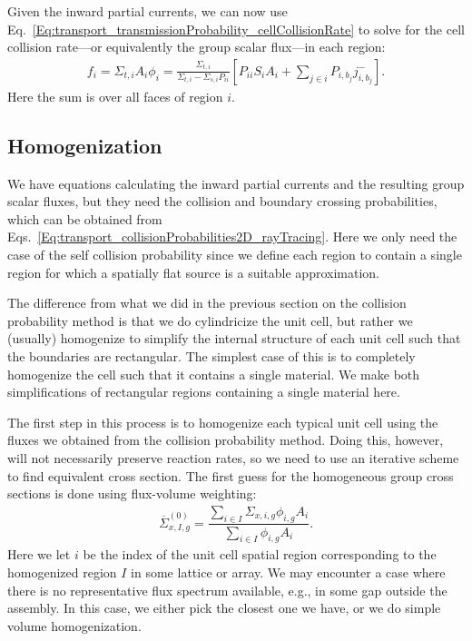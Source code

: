 Given the inward partial currents, we can now use Eq.~\eqref{Eq:transport_transmissionProbability_cellCollisionRate} to solve for the cell collision rate---or equivalently the group scalar flux---in each region:
\begin{align} \label{Eq:transport_collisionRates_responseMatrix_finalResult}
  f_i = \Sigma_{t,i} A_i \phi_i 
  = \frac{ \Sigma_{t,i} }{ \Sigma_{t,i} - \Sigma_{s,i} P_{ii} } \left[ P_{ii} S_i A_i + \displaystyle\sum_{j \in i} P_{i,b_j} j^-_{i,b_j} \right] .
\end{align}
Here the sum is over all faces of region $i$.




\subsection{Homogenization}

We have equations calculating the inward partial currents and the resulting group scalar fluxes, but they need the collision and boundary crossing probabilities, which can be obtained from Eqs.~\eqref{Eq:transport_collisionProbabilities2D_rayTracing}. Here we only need the case of the self collision probability since we define each region to contain a single region for which a spatially flat source is a suitable approximation. 

The difference from what we did in the previous section on the collision probability method is that we do cylindricize the unit cell, but rather we (usually) homogenize to simplify the internal structure of each unit cell such that the boundaries are rectangular. The simplest case of this is to completely homogenize the cell such that it contains a single material. We make both simplifications of rectangular regions containing a single material here.

The first step in this process is to homogenize each typical unit cell using the fluxes we obtained from the collision probability method. Doing this, however, will not necessarily preserve reaction rates, so we need to use an iterative scheme to find equivalent cross section. The first guess for the homogeneous group cross sections is done using flux-volume weighting:
\begin{align}
  \overline{\Sigma}_{x,I,g}^{(0)} = \dfrac{ \displaystyle\sum_{i \in I} \Sigma_{x,i,g} \phi_{i,g} A_i }{  \displaystyle\sum_{i \in I} \phi_{i,g} A_i } .
\end{align}
Here we let $i$ be the index of the unit cell spatial region corresponding to the homogenized region $I$ in some lattice or array. We may encounter a case where there is no representative flux spectrum available, e.g., in some gap outside the assembly. In this case, we either pick the closest one we have, or we do simple volume homogenization.


